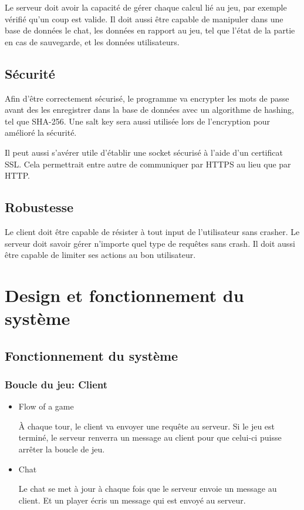 Le serveur doit avoir la capacité de gérer chaque calcul lié au jeu, par exemple vérifié qu'un coup est valide. Il doit aussi être capable
de manipuler dans une base de données le chat, les données en rapport au jeu, tel que l'état de la partie en cas de sauvegarde, et les 
données utilisateurs.

\subsection{Sécurité}
Afin d'être correctement sécurisé, le programme va encrypter les mots de passe avant des les enregistrer dans la base de données avec un
algorithme de hashing, tel que SHA-256. Une salt key sera aussi utilisée lors de l'encryption pour amélioré la sécurité.

Il peut aussi s'avérer utile d'établir une socket sécurisé à l'aide d'un certificat SSL. Cela permettrait entre autre de communiquer par HTTPS au
lieu que par HTTP.

\subsection{Robustesse}
Le client doit être capable de résister à tout input de l'utilisateur sans crasher.
Le serveur doit savoir gérer n'importe quel type de requêtes sans crash. Il doit aussi être capable de limiter ses actions au bon utilisateur.

\section{Design et fonctionnement du système}
\subsection{Fonctionnement du système}
\subsubsection{Boucle du jeu: Client}


\begin{itemize}
    \item Flow of a game

        À chaque tour, le client va envoyer une requête au serveur. Si le jeu est terminé, le serveur renverra un message au client pour que
        celui-ci puisse arrêter la boucle de jeu.
    \item Chat

        Le chat se met à jour à chaque fois que le serveur envoie un message au client. Et un player écris un message qui est envoyé au serveur.
\end{itemize}
